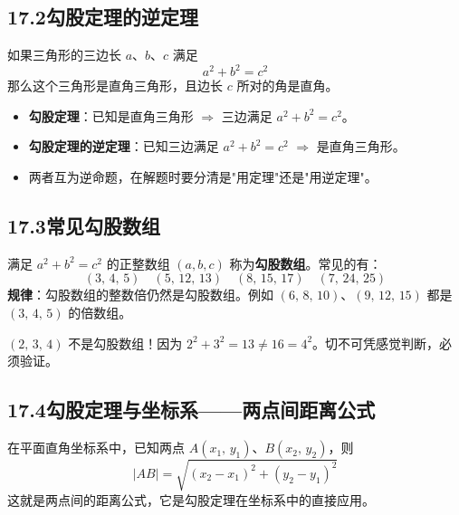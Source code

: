 \documentclass[12pt, a4paper]{ctexart}
\begin{document}
\subsection*{17.2\quad 勾股定理的逆定理}

\begin{knowledgebox}[勾股定理的逆定理]
如果三角形的三边长 $a$、$b$、$c$ 满足
\[
a^2 + b^2 = c^2
\]
那么这个三角形是直角三角形，且边长 $c$ 所对的角是直角。
\end{knowledgebox}

\begin{tipbox}[定理与逆定理的区别]
\begin{itemize}
  \item \textbf{勾股定理}：已知是直角三角形 $\Rightarrow$ 三边满足 $a^2+b^2=c^2$。
  \item \textbf{勾股定理的逆定理}：已知三边满足 $a^2+b^2=c^2$ $\Rightarrow$ 是直角三角形。
  \item 两者互为逆命题，在解题时要分清是"用定理"还是"用逆定理"。
\end{itemize}
\end{tipbox}

\subsection*{17.3\quad 常见勾股数组}

\begin{knowledgebox}[常见勾股数组]
满足 $a^2 + b^2 = c^2$ 的正整数组 $(a, b, c)$ 称为\textbf{勾股数组}。常见的有：
\[
(3,\, 4,\, 5) \quad (5,\, 12,\, 13) \quad (8,\, 15,\, 17) \quad (7,\, 24,\, 25)
\]
\textbf{规律}：勾股数组的整数倍仍然是勾股数组。例如 $(6,\,8,\,10)$、$(9,\,12,\,15)$ 都是 $(3,\,4,\,5)$ 的倍数组。
\end{knowledgebox}

\begin{warnbox}[注意]
$(2,\,3,\,4)$ 不是勾股数组！因为 $2^2+3^2=13 \neq 16=4^2$。切不可凭感觉判断，必须验证。
\end{warnbox}

\subsection*{17.4\quad 勾股定理与坐标系——两点间距离公式}

\begin{knowledgebox}[两点间距离公式]
在平面直角坐标系中，已知两点 $A(x_1,\, y_1)$、$B(x_2,\, y_2)$，则
\[
|AB| = \sqrt{(x_2 - x_1)^2 + (y_2 - y_1)^2}
\]
这就是两点间的距离公式，它是勾股定理在坐标系中的直接应用。
\end{knowledgebox}
\end{document}
